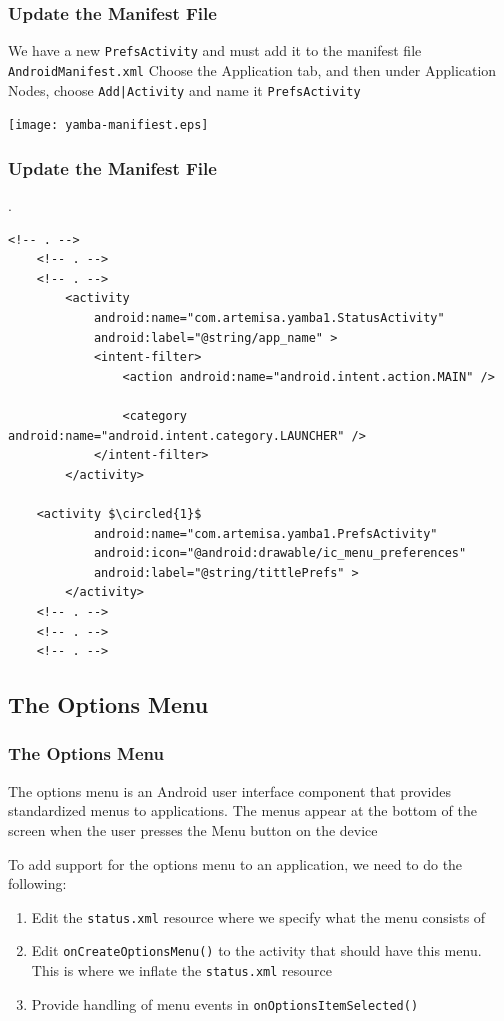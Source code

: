 \begin{frame}[containsverbatim]
\frametitle{Update the Manifest File}
We have a new \texttt{PrefsActivity} and must add it to the manifest file  \texttt{AndroidManifest.xml}
Choose the Application tab, and then under Application Nodes, choose \texttt{Add|Activity} and name it \texttt{PrefsActivity}

\centering
\texttt{[image: yamba-manifiest.eps]}

\end{frame}
\begin{frame}[containsverbatim]
\frametitle{Update the Manifest File}
\lstset{language=XML, style=eclipse}.
\begin{adjustbox}{width=1.0 \textwidth}
\begin{lstlisting}[caption=YambaManifiest.xml, basicstyle=\scriptsize,escapechar=$]
    <!-- . -->
    <!-- . -->
    <!-- . -->
        <activity
            android:name="com.artemisa.yamba1.StatusActivity"
            android:label="@string/app_name" >
            <intent-filter>
                <action android:name="android.intent.action.MAIN" />

                <category android:name="android.intent.category.LAUNCHER" />
            </intent-filter>
        </activity>

	<activity $\circled{1}$
            android:name="com.artemisa.yamba1.PrefsActivity"
            android:icon="@android:drawable/ic_menu_preferences"
            android:label="@string/tittlePrefs" >
        </activity>
    <!-- . -->
    <!-- . -->
    <!-- . -->
\end{lstlisting}
\end{adjustbox}
\end{frame}
\subsection{The Options Menu}
\begin{frame}
\frametitle{The Options Menu}
The options menu is an Android user interface component that provides standardized
menus to applications. The menus appear at the bottom of the screen when the user
presses the Menu button on the device

To add support for the options menu to an application, we need to do the following:

\begin{enumerate}
\item Edit the \texttt{status.xml} resource where we specify what the menu consists of
\item Edit \texttt{onCreateOptionsMenu()} to the activity that should have this menu. This is
where we inflate the \texttt{status.xml} resource
\item Provide handling of menu events in \texttt{onOptionsItemSelected()}
\end{enumerate}
\end{frame}


